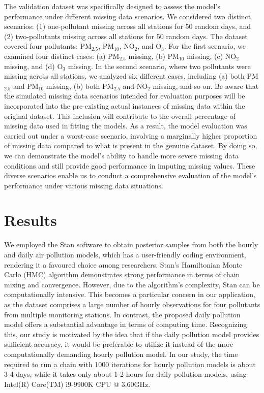 \documentclass[
  12,
]{article}
\begin{document}
The validation dataset was specifically designed to assess the model's
performance under different missing data scenarios. We considered two
distinct scenarios: (1) one-pollutant missing across all stations for 50
random days, and (2) two-pollutants missing across all stations for 50
random days. The dataset covered four pollutants: PM\(_{2.5}\),
PM\(_{10}\), NO\(_2\), and O\(_3\). For the first scenario, we examined
four distinct cases: (a) PM\(_{2.5}\) missing, (b) PM\(_{10}\) missing,
(c) NO\(_2\) missing, and (d) O\(_3\) missing. In the second scenario,
where two pollutants were missing across all stations, we analyzed six
different cases, including (a) both PM\(_{2.5}\) and PM\(_{10}\)
missing, (b) both PM\(_{2.5}\) and NO\(_2\) missing, and so on. Be aware
that the simulated missing data scenarios intended for evaluation
purposes will be incorporated into the pre-existing actual instances of
missing data within the original dataset. This inclusion will contribute
to the overall percentage of missing data used in fitting the models. As
a result, the model evaluation was carried out under a worst-case
scenario, involving a marginally higher proportion of missing data
compared to what is present in the genuine dataset. By doing so, we can
demonstrate the model's ability to handle more severe missing data
conditions and still provide good performance in imputing missing
values. These diverse scenarios enable us to conduct a comprehensive
evaluation of the model's performance under various missing data
situations.

\hypertarget{results}{%
\section{Results}\label{results}}

We employed the Stan software \autocite{stan} to obtain posterior
samples from both the hourly and daily air pollution models, which has a
user-friendly coding environment, rendering it a favoured choice among
researchers. Stan's Hamiltonian Monte Carlo (HMC) algorithm demonstrates
strong performance in terms of chain mixing and convergence. However,
due to the algorithm's complexity, Stan can be computationally
intensive. This becomes a particular concern in our application, as the
dataset comprises a large number of hourly observations for four
pollutants from multiple monitoring stations. In contrast, the proposed
daily pollution model offers a substantial advantage in terms of
computing time. Recognizing this, our study is motivated by the idea
that if the daily pollution model provides sufficient accuracy, it would
be preferable to utilize it instead of the more computationally
demanding hourly pollution model. In our study, the time required to run
a chain with 1000 iterations for hourly pollution models is about 3-4
days, while it takes only about 1-2 hours for daily pollution models,
using Intel(R) Core(TM) i9-9900K CPU @ 3.60GHz.
\end{document}

